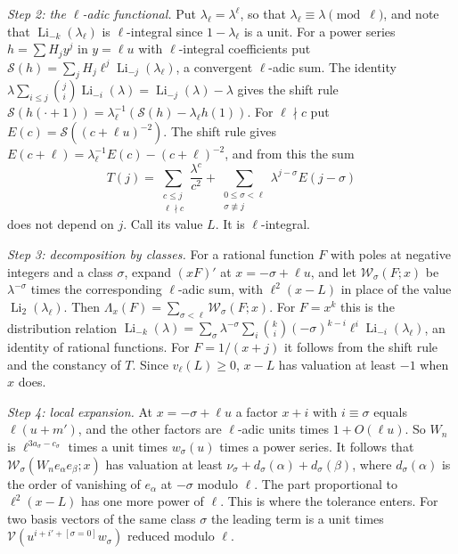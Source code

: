 \documentclass[11pt]{amsart}
\theoremstyle{definition}
\theoremstyle{remark}
\numberwithin{equation}{section}
\newcommand{\Li}{\operatorname{Li}}
\begin{document}
\emph{Step 2: the $\ell$-adic functional.} Put $\lambda_\ell=\lambda^\ell$, so that $\lambda_\ell\equiv\lambda\pmod\ell$,
and note that $\Li_{-k}(\lambda_\ell)$ is $\ell$-integral since $1-\lambda_\ell$ is a unit. For a power series
$h=\sum H_jy^j$ in $y=\ell u$ with $\ell$-integral coefficients put $\mathcal S(h)=\sum_jH_j\ell^j\Li_{-j}(\lambda_\ell)$,
a convergent $\ell$-adic sum. The identity $\lambda\sum_{i\le j}\binom ji\Li_{-i}(\lambda)=\Li_{-j}(\lambda)-\lambda$ gives
the shift rule $\mathcal S(h(\cdot+1))=\lambda_\ell^{-1}(\mathcal S(h)-\lambda_\ell h(1))$. For $\ell\nmid c$ put
$E(c)=\mathcal S((c+\ell u)^{-2})$. The shift rule gives $E(c+\ell)=\lambda_\ell^{-1}E(c)-(c+\ell)^{-2}$, and from this
the sum
\[
 T(j)=\sum_{\substack{c\le j\\ \ell\nmid c}}\frac{\lambda^c}{c^2}+\sum_{\substack{0\le\sigma<\ell\\ \sigma\not\equiv j}}\lambda^{j-\sigma}E(j-\sigma)
\]
does not depend on $j$. Call its value $L$. It is $\ell$-integral.

\emph{Step 3: decomposition by classes.} For a rational function $F$ with poles at negative integers and a class
$\sigma$, expand $(xF)'$ at $x=-\sigma+\ell u$, and let $\mathcal W_\sigma(F;x)$ be $\lambda^{-\sigma}$ times the
corresponding $\ell$-adic sum, with $\ell^2(x-L)$ in place of the value $\Li_2(\lambda_\ell)$. Then
$\Lambda_x(F)=\sum_{\sigma<\ell}\mathcal W_\sigma(F;x)$. For $F=x^k$ this is the distribution relation
$\Li_{-k}(\lambda)=\sum_\sigma\lambda^{-\sigma}\sum_i\binom ki(-\sigma)^{k-i}\ell^i\Li_{-i}(\lambda_\ell)$, an identity of
rational functions. For $F=1/(x+j)$ it follows from the shift rule and the constancy of $T$. Since $v_\ell(L)\ge0$,
$x-L$ has valuation at least $-1$ when $x$ does.

\emph{Step 4: local expansion.} At $x=-\sigma+\ell u$ a factor $x+i$ with $i\equiv\sigma$ equals $\ell(u+m')$, and the
other factors are $\ell$-adic units times $1+O(\ell u)$. So $W_n$ is $\ell^{3a_\sigma-c_\sigma}$ times a unit times
$w_\sigma(u)$ times a power series. It follows that $\mathcal W_\sigma(W_ne_\alpha e_\beta;x)$ has valuation at least
$\nu_\sigma+d_\sigma(\alpha)+d_\sigma(\beta)$, where $d_\sigma(\alpha)$ is the order of vanishing of $e_\alpha$ at $-\sigma$
modulo $\ell$. The part proportional to $\ell^2(x-L)$ has one more power of $\ell$. This is where the tolerance enters.
For two basis vectors of the same class $\sigma$ the leading term is a unit times
$\mathcal V(u^{i+i'+[\sigma=0]}w_\sigma)$ reduced modulo $\ell$.
\end{document}
